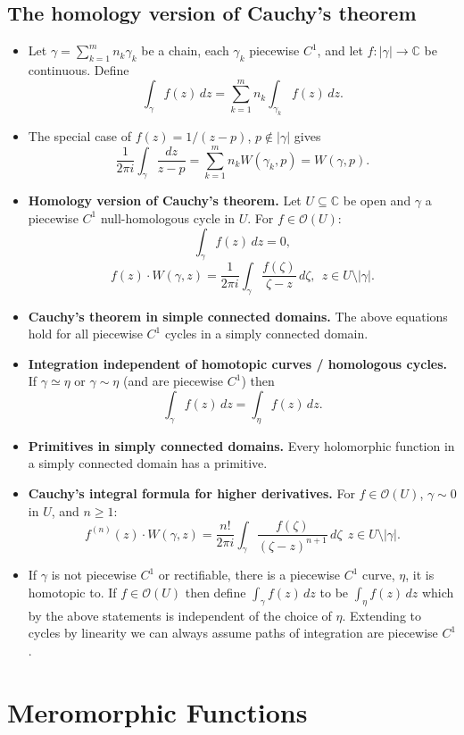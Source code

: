 \documentclass{article}
\newenvironment{topic}[1]{%
{\subsection{#1}}%
\begin{itemize}%
}{%
\end{itemize}%
}
\newcommand{\theorem}[1]{\item {\bf #1.}}
\newcommand{\corollary}[1]{\item {\bf #1.}}
\newcommand{\holo}[1]{\mathcal{O}(#1)}
\newcommand{\remark}{\item}
\begin{document}
\begin{topic}{The homology version of Cauchy's theorem}

\remark Let $\gamma = \sum_{k=1}^m n_k \gamma_k$ be a chain, each $\gamma_k$ piecewise $C^1$, and let $f : |\gamma| \to \mathbb{C}$ be continuous. Define $$\int_\gamma f(z)\,dz = \sum_{k=1}^m n_k \int_{\gamma_k} f(z)\,dz.$$

\remark The special case of $f(z) = 1/(z-p)$, $p \not\in |\gamma|$ gives $$\dfrac{1}{2 \pi i} \int_\gamma \dfrac{dz}{z - p} = \sum_{k=1}^m n_k W(\gamma_k, p) = W(\gamma, p).$$

\theorem{Homology version of Cauchy's theorem} Let $U \subseteq \mathbb{C}$ be open and $\gamma$ a piecewise $C^1$ null-homologous cycle in $U$. For $f \in \holo{U}$: $$\int_\gamma f(z)\,dz = 0,$$ $$f(z) \cdot W(\gamma, z) = \dfrac{1}{2 \pi i} \int_\gamma \dfrac{f(\zeta)}{\zeta - z}\,d\zeta,~~z \in U \setminus |\gamma|.$$

\corollary{Cauchy's theorem in simple connected domains} The above equations hold for all piecewise $C^1$ cycles in a simply connected domain.

\corollary{Integration independent of homotopic curves / homologous cycles} If $\gamma \simeq \eta$ or $\gamma \sim \eta$ (and are piecewise $C^1$) then $$\int_\gamma f(z)\,dz = \int_\eta f(z)\,dz.$$

\theorem{Primitives in simply connected domains} Every holomorphic function in a simply connected domain has a primitive.

\corollary{Cauchy's integral formula for higher derivatives} For $f \in \holo{U}$, $\gamma \sim 0$ in $U$, and $n \geq 1$: $$f^{(n)}(z) \cdot W(\gamma, z) = \dfrac{n!}{2 \pi i} \int_\gamma \dfrac{f(\zeta)}{(\zeta - z)^{n+1}}\,d\zeta~~z \in U \setminus |\gamma|.$$

\remark If $\gamma$ is not piecewise $C^1$ or rectifiable, there is a piecewise $C^1$ curve, $\eta$, it is homotopic to. If $f \in \holo{U}$ then define $\int_\gamma f(z)\,dz$ to be $\int_\eta f(z)\,dz$ which by the above statements is independent of the choice of $\eta$. Extending to cycles by linearity we can always assume paths of integration are piecewise $C^1$.

\end{topic}


\newpage
\section{Meromorphic Functions}
\end{document}
